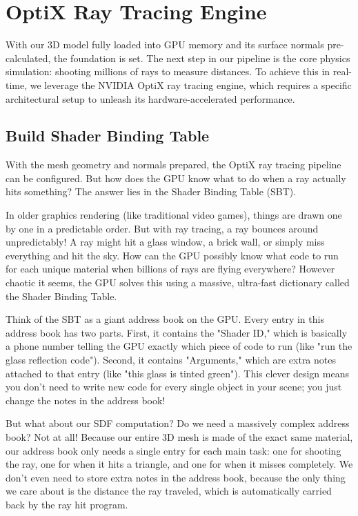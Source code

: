 \section{OptiX Ray Tracing Engine}

With our 3D model fully loaded into GPU memory and its surface normals pre-calculated, the foundation is set. The next step in our pipeline is the core physics simulation: shooting millions of rays to measure distances. To achieve this in real-time, we leverage the NVIDIA OptiX ray tracing engine, which requires a specific architectural setup to unleash its hardware-accelerated performance.

\subsection{Build Shader Binding Table}

With the mesh geometry and normals prepared, the OptiX ray tracing pipeline can be configured. But how does the GPU know what to do when a ray actually hits something? The answer lies in the Shader Binding Table (SBT).

In older graphics rendering (like traditional video games), things are drawn one by one in a predictable order. But with ray tracing, a ray bounces around unpredictably! A ray might hit a glass window, a brick wall, or simply miss everything and hit the sky. How can the GPU possibly know what code to run for each unique material when billions of rays are flying everywhere? However chaotic it seems, the GPU solves this using a massive, ultra-fast dictionary called the Shader Binding Table.

Think of the SBT as a giant address book on the GPU. Every entry in this address book has two parts. First, it contains the "Shader ID," which is basically a phone number telling the GPU exactly which piece of code to run (like "run the glass reflection code"). Second, it contains "Arguments," which are extra notes attached to that entry (like "this glass is tinted green"). This clever design means you don't need to write new code for every single object in your scene; you just change the notes in the address book!

But what about our SDF computation? Do we need a massively complex address book? Not at all! Because our entire 3D mesh is made of the exact same material, our address book only needs a single entry for each main task: one for shooting the ray, one for when it hits a triangle, and one for when it misses completely. We don't even need to store extra notes in the address book, because the only thing we care about is the distance the ray traveled, which is automatically carried back by the ray hit program.

